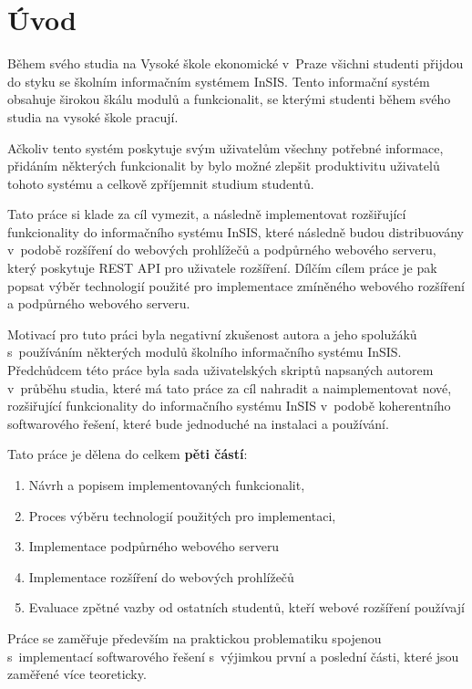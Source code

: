 \chapter*{Úvod}

Během svého studia na Vysoké škole ekonomické v~Praze všichni studenti přijdou do styku se školním informačním systémem InSIS. Tento informační systém obsahuje širokou škálu modulů a funkcionalit, se kterými studenti během svého studia na vysoké škole pracují.

Ačkoliv tento systém poskytuje svým uživatelům všechny potřebné informace, přidáním některých funkcionalit by bylo možné zlepšit produktivitu uživatelů tohoto systému a celkově zpříjemnit studium studentů.

Tato práce si klade za cíl vymezit, a následně implementovat rozšiřující funkcionality do informačního systému InSIS, které následně budou distribuovány v~podobě rozšíření do webových prohlížečů a podpůrného webového serveru, který poskytuje REST API pro uživatele rozšíření. Dílčím cílem práce je pak popsat výběr technologií použité pro implementace zmíněného webového rozšíření a podpůrného webového serveru.

Motivací pro tuto práci byla negativní zkušenost autora a jeho spolužáků s~používáním některých modulů školního informačního systému InSIS. 
Předchůdcem této práce byla sada uživatelských skriptů napsaných autorem v~průběhu studia, které má tato práce za cíl nahradit a naimplementovat nové, rozšiřující funkcionality do informačního systému InSIS v~podobě koherentního softwarového řešení, které bude jednoduché na instalaci a používání.

Tato práce je dělena do celkem \textbf{pěti částí}: 

\begin{enumerate}
    \item Návrh a popisem implementovaných funkcionalit,
    \item Proces výběru technologií použitých pro implementaci,
    \item Implementace podpůrného webového serveru
    \item Implementace rozšíření do webových prohlížečů
    \item Evaluace zpětné vazby od ostatních studentů, kteří webové rozšíření používají
\end{enumerate}

Práce se zaměřuje především na praktickou problematiku spojenou s~implementací softwarového řešení s~výjimkou první a poslední části, které jsou zaměřené více teoreticky.

